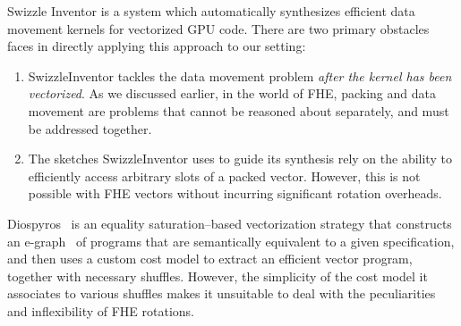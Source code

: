
Swizzle Inventor \cite{SwizzleInventor} is a system which automatically synthesizes efficient data movement kernels for vectorized GPU code.
There are two primary obstacles \system faces in directly applying this approach to our setting:
\begin{enumerate}
    \item SwizzleInventor tackles the data movement problem {\em after the kernel has been vectorized}. As we discussed earlier, in the world of FHE, packing and data movement are problems that cannot be reasoned about separately, and must be addressed together.
    \item The sketches SwizzleInventor uses to guide its synthesis rely on the ability to efficiently access arbitrary slots of a packed vector. However, this is not possible with FHE vectors without incurring significant rotation overheads.
\end{enumerate}

Diospyros~\cite{Diospyros} is an equality saturation--based vectorization strategy that constructs an e-graph~\cite{EqualitySaturation, egg} of programs that are semantically equivalent to a given specification, and then uses a custom cost model to extract an efficient vector program, together with necessary shuffles.
However, the simplicity of the cost model it associates to various shuffles makes it unsuitable to deal with the peculiarities and inflexibility of FHE rotations.


